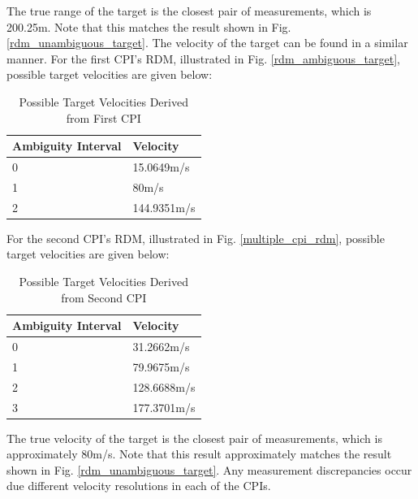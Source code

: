 \documentclass[conference]{IEEEtran}
\begin{document}
\noindent
The true range of the target is the closest pair of measurements, which is 200.25m. Note that this matches the result shown in Fig. \ref{rdm_unambiguous_target}. The velocity of the target can be found in a similar manner. For the first CPI's RDM, illustrated in Fig. \ref{rdm_ambiguous_target}, possible target velocities are given below:
\begin{table}[H]
\caption{Possible Target Velocities Derived from First CPI}
\label{Velocity CPI0}
\begin{tabularx}{0.5\textwidth}{| X | X |}
\hline
Ambiguity Interval & Velocity \\
\hline
0 & 15.0649m/s \\
\hline
1 & 80m/s \\
\hline
2 & 144.9351m/s \\
\hline
\end{tabularx}
\end{table}
\noindent
For the second CPI's RDM, illustrated in Fig. \ref{multiple_cpi_rdm}, possible target velocities are given below:
\begin{table}[H]
\caption{Possible Target Velocities Derived from Second CPI}
\label{Velocity CPI1}
\begin{tabularx}{0.5\textwidth}{| X | X |}
\hline
Ambiguity Interval & Velocity \\
\hline
0 & 31.2662m/s \\
\hline
1 & 79.9675m/s \\
\hline
2 & 128.6688m/s \\
\hline
3 & 177.3701m/s \\
\hline
\end{tabularx}
\end{table}
\noindent
The true velocity of the target is the closest pair of measurements, which is approximately 80m/s. Note that this result approximately matches the result shown in Fig. \ref{rdm_unambiguous_target}. Any measurement discrepancies occur due different velocity resolutions in each of the CPIs.
\end{document}
